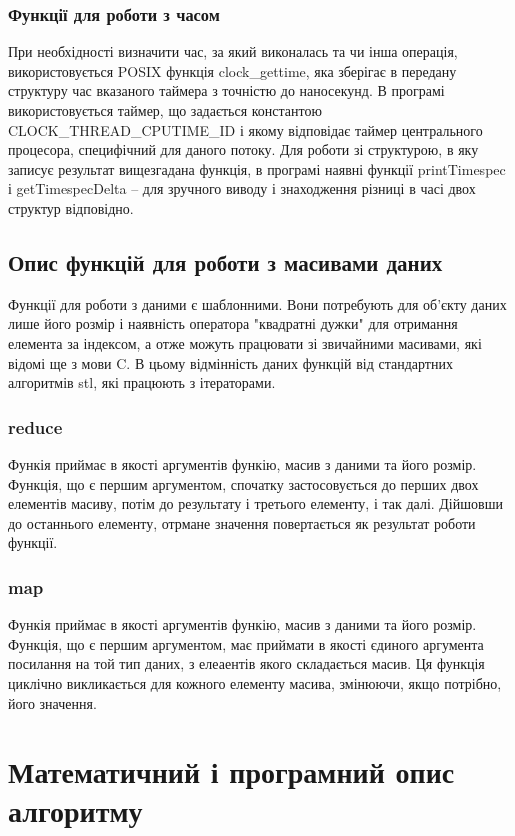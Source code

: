 \documentclass[a4paper,12pt]{article}
\begin{document}
\subsubsection{Функції для роботи з часом}
При необхідності визначити час, за який виконалась та чи інша операція, використовується POSIX функція clock\_gettime, яка зберігає в передану структуру час вказаного таймера з точністю до наносекунд. В програмі використовується таймер, що задається константою CLOCK\_THREAD\_CPUTIME\_ID і якому відповідає таймер центрального процесора, специфічний для даного потоку. Для роботи зі структурою, в яку записує результат вищезгадана функція, в програмі наявні функції printTimespec і getTimespecDelta -- для зручного виводу і знаходження різниці в часі двох структур відповідно.

\subsection{Опис функцій для роботи з масивами даних}
Функції для роботи з даними є шаблонними. Вони потребують для об’єкту даних лише його розмір і наявність оператора "квадратні дужки" для отримання елемента за індексом, а отже можуть працювати зі звичайними масивами, які відомі ще з мови C. В цьому відмінність даних функцій від стандартних алгоритмів stl, які працюють з ітераторами.

\subsubsection{reduce}
Функія приймає в якості аргументів функію, масив з даними та його розмір. Функція, що є першим аргументом, спочатку застосовується до перших двох елементів масиву, потім до результату і третього елементу, і так далі. Дійшовши до останнього елементу, отрмане значення повертається як результат роботи функції.

\subsubsection{map}
Функія приймає в якості аргументів функію, масив з даними та його розмір. Функція, що є першим аргументом, має приймати в якості єдиного аргумента посилання на той тип даних, з елеаентів якого складається масив. Ця функція циклічно викликається для кожного елементу масива, змінюючи, якщо потрібно, його значення.

\newpage

\section{Математичний і програмний опис алгоритму}
\end{document}
